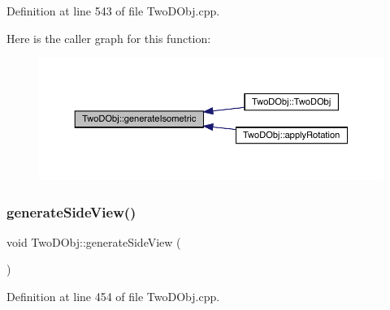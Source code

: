 Definition at line 543 of file Two\+D\+Obj.\+cpp.

Here is the caller graph for this function\+:
\nopagebreak
\begin{figure}[H]
\begin{center}
\leavevmode
\includegraphics[width=350pt]{class_two_d_obj_a6df93c379589948f30db2eacfa5d68bb_icgraph}
\end{center}
\end{figure}
\mbox{\label{class_two_d_obj_a19b8f32d11ae455e15297aefa0028967}} 
\subsubsection{\texorpdfstring{generate\+Side\+View()}{generateSideView()}}
{\footnotesize\ttfamily void Two\+D\+Obj\+::generate\+Side\+View (\begin{DoxyParamCaption}{ }\end{DoxyParamCaption})}



Definition at line 454 of file Two\+D\+Obj.\+cpp.

